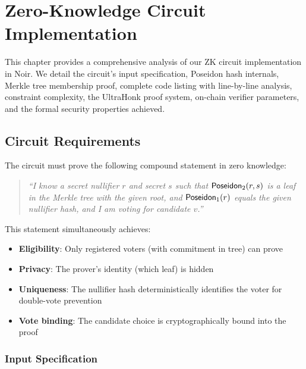 \chapter{Zero-Knowledge Circuit Implementation}\label{ch:circuit}

This chapter provides a comprehensive analysis of our ZK circuit implementation in Noir. We detail the circuit's input specification, Poseidon hash internals, Merkle tree membership proof, complete code listing with line-by-line analysis, constraint complexity, the UltraHonk proof system, on-chain verifier parameters, and the formal security properties achieved.

\section{Circuit Requirements}

The circuit must prove the following compound statement in zero knowledge:

\begin{quote}
\textit{``I know a secret nullifier $r$ and secret $s$ such that $\mathsf{Poseidon}_2(r, s)$ is a leaf in the Merkle tree with the given root, and $\mathsf{Poseidon}_1(r)$ equals the given nullifier hash, and I am voting for candidate $v$.''}
\end{quote}

This statement simultaneously achieves:
\begin{itemize}
    \item \textbf{Eligibility}: Only registered voters (with commitment in tree) can prove
    \item \textbf{Privacy}: The prover's identity (which leaf) is hidden
    \item \textbf{Uniqueness}: The nullifier hash deterministically identifies the voter for double-vote prevention
    \item \textbf{Vote binding}: The candidate choice is cryptographically bound into the proof
\end{itemize}

\subsection{Input Specification}

